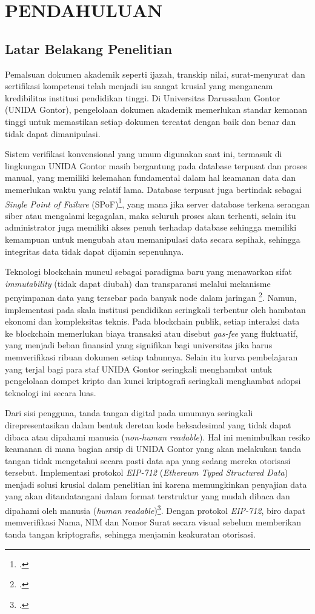 \chapter{PENDAHULUAN}
	\section{Latar Belakang Penelitian}
	\setlength{\leftskip}{0.7cm}
	Pemalsuan dokumen akademik seperti ijazah, transkip nilai, surat-menyurat dan sertifikasi kompetensi telah menjadi isu sangat krusial yang mengancam kredibilitas institusi pendidikan tinggi. Di Universitas Darussalam Gontor (UNIDA Gontor), pengelolaan dokumen akademik memerlukan standar kemanan tinggi untuk memastikan setiap dokumen tercatat dengan baik dan benar dan tidak dapat dimanipulasi. 

	Sistem verifikasi konvensional yang umum digunakan saat ini, termasuk di lingkungan UNIDA Gontor masih bergantung pada database terpusat dan proses manual,  yang memiliki kelemahan fundamental dalam hal keamanan data dan memerlukan waktu yang relatif lama. Database terpusat juga bertindak sebagai \textit{Single Point of Failure} (SPoF)\footcite{Awang2025}, yang mana jika server database terkena serangan siber atau mengalami kegagalan, maka seluruh proses akan terhenti, selain itu administrator juga memiliki akses penuh terhadap database sehingga memiliki kemampuan untuk mengubah atau memanipulasi data secara sepihak, sehingga integritas data tidak dapat dijamin sepenuhnya.

	Teknologi blockchain muncul sebagai paradigma baru yang menawarkan sifat \textit{immutability} (tidak dapat diubah) dan  transparansi melalui mekanisme penyimpanan data yang tersebar pada banyak node dalam jaringan \footcite{Zheng2017}. Namun, implementasi pada skala institusi pendidikan seringkali terbentur oleh hambatan ekonomi dan kompleksitas teknis. Pada blockchain publik, setiap interaksi data ke blockchain memerlukan biaya transaksi  atau disebut \textit{gas-fee} yang fluktuatif, yang menjadi beban finansial yang signifikan bagi universitas jika harus memverifikasi ribuan dokumen setiap tahunnya. Selain itu kurva pembelajaran yang terjal bagi para staf UNIDA Gontor seringkali menghambat untuk pengelolaan dompet kripto dan kunci kriptografi seringkali menghambat adopsi teknologi ini secara luas. 

	Dari sisi pengguna, tanda tangan digital pada umumnya seringkali direpresentasikan dalam bentuk deretan kode heksadesimal yang tidak dapat dibaca atau dipahami manusia (\textit{non-human readable}). Hal ini menimbulkan resiko keamanan di mana bagian arsip di UNIDA Gontor yang akan melakukan tanda tangan tidak mengetahui secara pasti data apa yang sedang mereka otorisasi tersebut. Implementasi protokol \textit{EIP-712} (\textit{Ethereum Typed Structured Data}) menjadi solusi krusial dalam penelitian ini karena memungkinkan penyajian data yang akan ditandatangani dalam format terstruktur yang mudah dibaca dan dipahami oleh manusia (\textit{human readable})\footcite{Bloemen2017}. Dengan protokol \textit{EIP-712}, biro dapat memverifikasi Nama, NIM dan Nomor Surat secara visual sebelum memberikan tanda tangan kriptografis, sehingga menjamin keakuratan otorisasi.  

